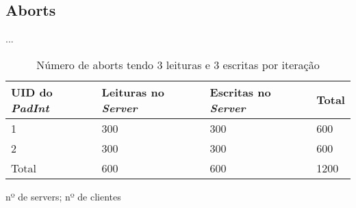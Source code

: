 \subsection{Aborts}
...

\begin{table}[H]
\centering
\begin{tabular}{| p{1.5cm} | p{1.5cm} | p{1.5cm} | p{1.5cm} |}
\hline
\textbf{UID do \textit{PadInt}} & \textbf{Leituras no \textit{Server}} & \textbf{Escritas no \textit{Server}} & \textbf{Total} \\
\hline
1 & 300 & 300 & 600  \\
\hline
2 & 300 & 300 & 600  \\
\hline
Total & 600 & 600 & 1200  \\
\hline
\end{tabular}
\caption{Número de aborts tendo 3 leituras e 3 escritas por iteração} \label{figAAborts}
\end{table}

nº de servers; nº de clientes  